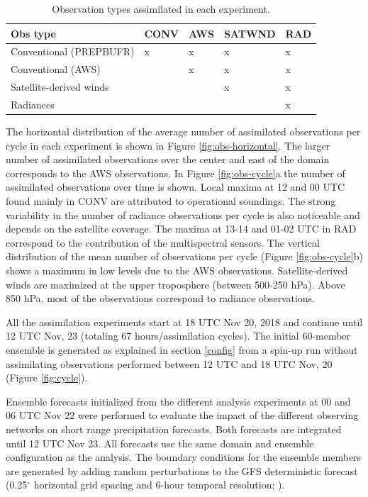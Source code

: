 \documentclass[preprint, 3p, authoryear,review, 12pt]{elsarticle} %
\begin{document}
\begin{table}

\caption{\label{tab:table-exp}Observation types assimilated in each experiment.}
\centering
\begin{tabu} to 
\toprule
Obs type & CONV & AWS & SATWND & RAD\\
\midrule
Conventional (PREPBUFR) & x & x & x & x\\
Conventional (AWS) &  & x & x & x\\
Satellite-derived winds &  &  & x & x\\
Radiances &  &  &  & x\\
\bottomrule
\end{tabu}
\end{table}

The horizontal distribution of the average number of assimilated observations per cycle in each experiment is shown in Figure \ref{fig:obs-horizontal}. The larger number of assimilated observations over the center and east of the domain corresponds to the AWS observations. In Figure \ref{fig:obs-cycle}a the number of assimilated observations over time is shown. Local maxima at 12 and 00 UTC found mainly in CONV are attributed to operational soundings. The strong variability in the number of radiance observations per cycle is also noticeable and depends on the satellite coverage. The maxima at 13-14 and 01-02 UTC in RAD correspond to the contribution of the multispectral sensors. The vertical distribution of the mean number of observations per cycle (Figure \ref{fig:obs-cycle}b) shows a maximum in low levels due to the AWS observations. Satellite-derived winds are maximized at the upper troposphere (between 500-250 hPa). Above 850 hPa, most of the observations correspond to radiance observations.

All the assimilation experiments start at 18 UTC Nov 20, 2018 and continue until 12 UTC Nov, 23 (totaling 67 hours/assimilation cycles). The initial 60-member ensemble is generated as explained in section \ref{config} from a spin-up run without assimilating observations performed between 12 UTC and 18 UTC Nov, 20 (Figure \ref{fig:cycle}).

Ensemble forecasts initialized from the different analysis experiments at 00 and 06 UTC Nov 22 were performed to evaluate the impact of the different observing networks on short range precipitation forecasts. Both forecasts are integrated until 12 UTC Nov 23. All forecasts use the same domain and ensemble configuration as the analysis. The boundary conditions for the ensemble members are generated by adding random perturbations to the GFS deterministic forecast (0.25\(^{\circ}\) horizontal grid spacing and 6-hour temporal resolution; \citet{cisl_rda_ds084.1}).
\end{document}
